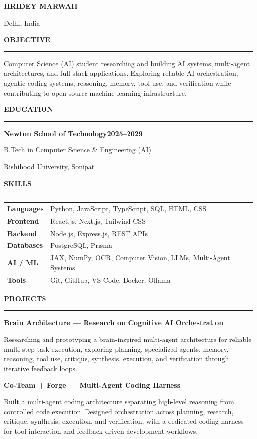 \documentclass[10pt,letterpaper]{article}
\newcommand{\resumeSection}[1]{%
  \vspace{4.2pt}%
  {\bfseries\large #1}\par
  \vspace{1.2pt}\hrule\vspace{3.2pt}%
}
\newcommand{\project}[2]{%
  \textbf{#1}\par
  {\small #2}\par
  \vspace{2.4pt}%
}
\newcommand{\contacticon}[3]{%
  \href{#1}{\textcolor{linkblue}{\makebox[1.6em][c]{#2}}}%
  \hspace{#3}%
}
\begin{document}
\begin{center}
  {\LARGE\bfseries HRIDEY MARWAH}\\[-1pt]
  {\small Delhi, India \enspace | \enspace
  \contacticon{mailto:hrideymarwah2907@gmail.com}{\faEnvelope}{0.25em}
  \contacticon{https://www.hrideymarwah.online}{\faGlobe}{0.25em}
  \contacticon{https://github.com/hrideymarwah15}{\faGithub}{0.25em}
  \contacticon{https://www.linkedin.com/in/hrideymarwah}{\faLinkedin}{0em}}
\end{center}
\vspace{-5pt}

\resumeSection{OBJECTIVE}
{\small Computer Science (AI) student researching and building AI systems, multi-agent architectures, and full-stack applications. Exploring reliable AI orchestration, agentic coding systems, reasoning, memory, tool use, and verification while contributing to open-source machine-learning infrastructure.}

\resumeSection{EDUCATION}
\textbf{Newton School of Technology}\hfill\textbf{2025--2029}\\[-1pt]
{\small B.Tech in Computer Science \& Engineering (AI)\par
Rishihood University, Sonipat}

\resumeSection{SKILLS}
{\small
\begin{tabular}{@{}>{\bfseries}p{0.95in}p{6.45in}@{}}
Languages & Python, JavaScript, TypeScript, SQL, HTML, CSS \\
Frontend & React.js, Next.js, Tailwind CSS \\
Backend & Node.js, Express.js, REST APIs \\
Databases & PostgreSQL, Prisma \\
AI / ML & JAX, NumPy, OCR, Computer Vision, LLMs, Multi-Agent Systems \\
Tools & Git, GitHub, VS Code, Docker, Ollama
\end{tabular}}

\resumeSection{PROJECTS}
\project{Brain Architecture --- Research on Cognitive AI Orchestration}{Researching and prototyping a brain-inspired multi-agent architecture for reliable multi-step task execution, exploring planning, specialized agents, memory, reasoning, tool use, critique, synthesis, execution, and verification through iterative feedback loops.}

\project{Co-Team + Forge --- Multi-Agent Coding Harness}{Built a multi-agent coding architecture separating high-level reasoning from controlled code execution. Designed orchestration across planning, research, critique, synthesis, execution, and verification, with a dedicated coding harness for tool interaction and feedback-driven development workflows.}
\end{document}
